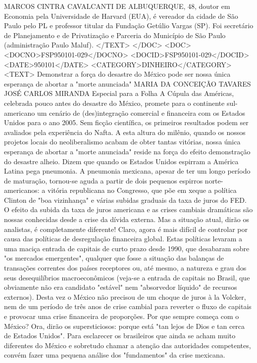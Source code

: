 MARCOS CINTRA CAVALCANTI DE ALBUQUERQUE, 48, doutor em Economia pela Universidade de Harvard (EUA), é vereador da cidade de São Paulo pelo PL e professor titular da Fundação Getúlio Vargas (SP). Foi secretário de Planejamento e de Privatização e Parceria do Município de São Paulo (administração Paulo Maluf).
</TEXT>
</DOC>
<DOC>
<DOCNO>FSP950101-029</DOCNO>
<DOCID>FSP950101-029</DOCID>
<DATE>950101</DATE>
<CATEGORY>DINHEIRO</CATEGORY>
<TEXT>
Demonstrar a força do desastre do México pode ser nossa única esperança de abortar a "morte anunciada" 
MARIA DA CONCEIÇÃO TAVARES 
JOSÉ CARLOS MIRANDA 
Especial para a Folha 
A Cúpula das Américas, celebrada pouco antes do desastre do México, promete para o continente sul-americano um cenário de (des)integração comercial e financeira com os Estados Unidos para o ano 2005. Sem ficção científica, os primeiros resultados podem ser avaliados pela experiência do Nafta.
A esta altura do milênio, quando os nossos projetos locais do neoliberalismo acabam de obter tantas vitórias, nossa única esperança de abortar a "morte anunciada" reside na força do efeito demonstração do desastre alheio.
Dizem que quando os Estados Unidos espirram a América Latina pega pneumonia. A pneumonia mexicana, apesar de ter um longo período de maturação, tornou-se aguda a partir de dois pequenos espirros norte-americanos: a vitória republicana no Congresso, que põe em xeque a política Clinton de "boa vizinhança" e várias subidas graduais da taxa de juros do FED.
O efeito da subida da taxa de juros americana e as crises cambiais dramáticas são nossas conhecidas desde a crise da dívida externa. Mas a situação atual, dirão os analistas, é completamente diferente! Claro, agora é mais difícil de controlar por causa das políticas de desregulação financeira global.
Estas políticas levaram a uma maciça entrada de capitais de curto prazo desde 1990, que desabaram sobre "os mercados emergentes", qualquer que fosse a situação das balanças de transações correntes dos países receptores ou, até mesmo, a natureza e grau dos seus desequilíbrios macroeconômicos (veja-se a entrada de capitais no Brasil, que obviamente não era candidato "estável" nem "absorvedor líquido" de recursos externos).
Desta vez o México não precisou de um choque de juros à la Volcker, nem de um período de três anos de crise cambial para reverter o fluxo de capitais e provocar uma crise financeira de proporções. Por que sempre começa com o México? Ora, dirão os supersticiosos: porque está "tan lejos de Dios e tan cerca de Estados Unidos".
Para esclarecer os brasileiros que ainda se acham muito diferentes do México e sobretudo chamar a atenção das autoridades competentes, convém fazer uma pequena análise dos "fundamentos" da crise mexicana.
